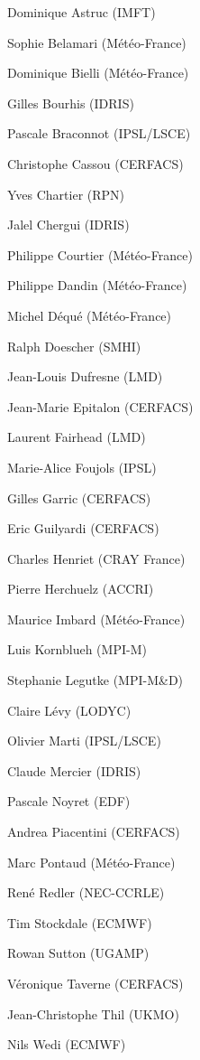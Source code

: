 \begin{description}
  \item Dominique Astruc (IMFT)
  \item Sophie Belamari (M\'et\'eo-France)
  \item Dominique Bielli (M\'et\'eo-France)
  \item Gilles Bourhis (IDRIS)
  \item Pascale Braconnot (IPSL/LSCE)
  \item Christophe Cassou (CERFACS)
  \item Yves Chartier (RPN)
  \item Jalel Chergui (IDRIS)
  \item Philippe Courtier (M\'et\'eo-France)
  \item Philippe Dandin (M\'et\'eo-France)
  \item Michel D\'equ\'e (M\'et\'eo-France)
  \item Ralph Doescher (SMHI)
  \item Jean-Louis Dufresne (LMD)
  \item Jean-Marie Epitalon (CERFACS)
  \item Laurent Fairhead (LMD)
  \item Marie-Alice Foujols (IPSL)
  \item Gilles Garric (CERFACS)
  \item Eric Guilyardi (CERFACS)
  \item Charles Henriet (CRAY France)
  \item Pierre Herchuelz (ACCRI)
  \item Maurice Imbard (M\'et\'eo-France)
  \item Luis Kornblueh (MPI-M)
  \item Stephanie Legutke (MPI-M\&D)
  \item Claire L\'evy (LODYC)
  \item Olivier Marti (IPSL/LSCE)
  \item Claude Mercier (IDRIS)
  \item Pascale Noyret (EDF)
  \item Andrea Piacentini (CERFACS)
  \item Marc Pontaud (M\'et\'eo-France)
  \item Ren\'e Redler (NEC-CCRLE)
  \item Tim Stockdale (ECMWF)
  \item Rowan Sutton (UGAMP)
  \item V\'eronique Taverne (CERFACS)
  \item Jean-Christophe Thil (UKMO)
  \item Nils Wedi (ECMWF)
\end{description}



